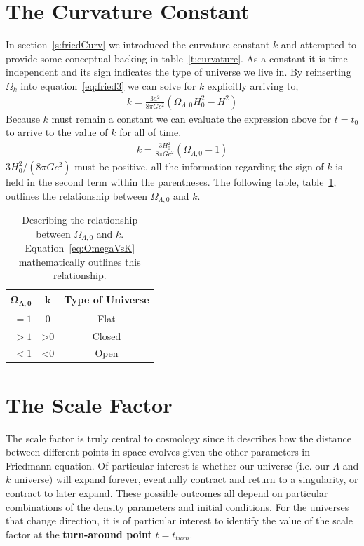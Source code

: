 \documentclass[twoside]{article}
\begin{document}
\section{The Curvature Constant}
 In section~\ref{s:friedCurv} we introduced the curvature constant $k$ and attempted to provide some conceptual  backing in table~\ref{t:curvature}. As a constant it is time independent and its sign indicates the type of universe we live in. By reinserting $\Omega_{k}$ into equation~\ref{eq:fried3} we can solve for $k$ explicitly arriving to,
\begin{align}
k = \frac{3a^{2}}{8\pi Gc^{2}}(\Omega_{\Lambda,0}H^{2}_{0}-H^{2})
\end{align} 
Because $k$ must remain a constant we can evaluate the expression above for $t=t_{0}$ to arrive to the value of $k$ for all of time.
\begin{align}
k = \frac{3H_{0}^{2}}{8\pi Gc^{2}}(\Omega_{\Lambda,0}-1)\label{eq:OmegaVsK}
\end{align} 
$3H_{0}^{2}/(8\pi Gc^{2})$ must be positive, all the information regarding the sign of $k$ is held in the second term within the parentheses.  The following table, table~\ref{t:signK}, outlines the relationship between $\Omega_{\Lambda,0}$ and $k$.


\begin{table}[h!]
  \begin{center}
    \begin{tabular}{ r| c c }
    \hline\hline
    $\boldsymbol{\Omega_{\Lambda,0}}$&$\boldsymbol{k}$& \textbf{Type of Universe}\\\hline\hline
    $=1$&0&Flat\\
    $>1$&>0 & Closed\\
    $<1$&<0 & Open\\
  
    \end{tabular}
  \end{center}
  \caption{Describing the relationship between $\Omega_{\Lambda,0}$ and $k$. Equation~\ref{eq:OmegaVsK} mathematically outlines this relationship.}\label{t:signK}
\end{table}


\section{The Scale Factor}
The scale factor is truly central to cosmology since it describes how the distance between different points in space evolves given the other parameters in Friedmann equation. Of particular interest is whether our universe (i.e. our $\Lambda$ and $k$ universe) will expand forever,  eventually contract and return to a singularity, or contract to later expand. These possible outcomes all depend on particular combinations of the density parameters and initial conditions. For the universes that change direction, it is of particular interest to identify the value of the scale factor at the \textbf{turn-around point} $t=t_{turn}$.\par
\end{document}
